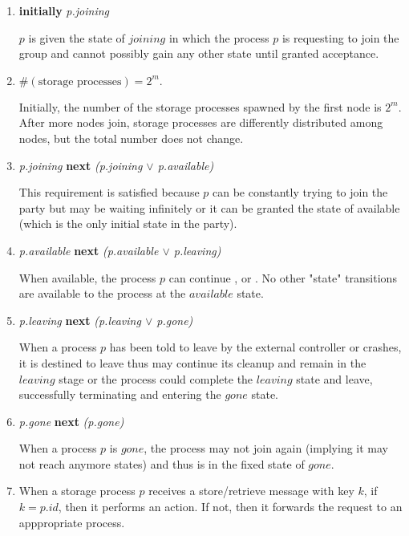 \documentclass[11pt]{article}
\begin{document}
\begin{enumerate}[S1]
\item {\bfseries initially} {\it p.joining}

$p$ is given the state of $joining$ in which the process $p$ is requesting to join the group and cannot possibly gain any other state until granted acceptance.


\item $\#(\text{storage processes}) = 2^m.$

Initially, the number of the storage processes spawned by the first node is $2^m.$ After more nodes join, storage processes are differently distributed among nodes, but the total number does not change.

\item {\it p.joining} {\bfseries next} {\it (p.joining $\vee$ p.available)}

This requirement is satisfied because $p$ can be constantly trying to join the party but may be waiting infinitely or it can be granted the state of available (which is the only initial state in the party).

\item {\it p.available} {\bfseries next} {\it (p.available $\vee$ p.leaving)}

When available, the process $p$ can continue \available, or \leaving. No other "state" transitions are available to the process at the $available$ state. 

\item {\it p.leaving} {\bfseries next} {\it (p.leaving $\vee$ p.gone)}

When a process $p$ has been told to leave by the external controller or crashes, it is destined to leave thus may continue its cleanup and remain in the $leaving$ stage or the process could complete the $leaving$ state and leave, successfully terminating and entering the $gone$ state.

\item {\it p.gone} {\bfseries next} {\it (p.gone)}

When a process $p$ is $gone$, the process may not join again (implying it may not reach anymore states) and thus is in the fixed state of $gone$.



\item When a storage process $p$ receives a store/retrieve message with key $k$, if $k = p.id$, then it performs an action. If not, then it forwards the request to an apppropriate process.


\end{enumerate}
\end{document}
